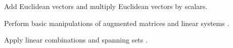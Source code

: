 \begin{readinessAssuranceOutcomes}
\item Add Euclidean vectors and multiply Euclidean vectors by scalars.
\item Perform basic manipulations of augmented matrices and linear
systems .
\item Apply linear combinations and spanning sets  .
\end{readinessAssuranceOutcomes}

